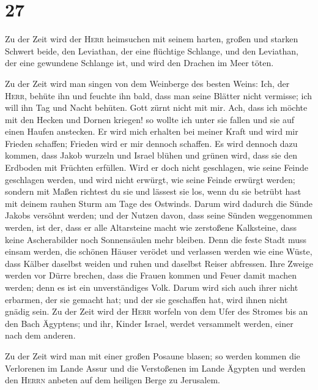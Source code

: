 \hypertarget{section-26}{%
\section{27}\label{section-26}}

 Zu der Zeit wird der \textsc{Herr} heimsuchen mit seinem
harten, großen und starken Schwert beide, den Leviathan, der eine
flüchtige Schlange, und den Leviathan, der eine gewundene Schlange ist,
und wird den Drachen im Meer töten.

 Zu der Zeit wird man singen von dem Weinberge des besten
Weins:  Ich, der \textsc{Herr}, behüte ihn und feuchte ihn
bald, dass man seine Blätter nicht vermisse; ich will ihn Tag und Nacht
behüten.  Gott zürnt nicht mit mir. Ach, dass ich möchte
mit den Hecken und Dornen kriegen! so wollte ich unter sie fallen und
sie auf einen Haufen anstecken.  Er wird mich erhalten bei
meiner Kraft und wird mir Frieden schaffen; Frieden wird er mir dennoch
schaffen.  Es wird dennoch dazu kommen, dass Jakob wurzeln
und Israel blühen und grünen wird, dass sie den Erdboden mit Früchten
erfüllen.  Wird er doch nicht geschlagen, wie seine Feinde
geschlagen werden, und wird nicht erwürgt, wie seine Feinde erwürgt
werden;  sondern mit Maßen richtest du sie und lässest sie
los, wenn du sie betrübt hast mit deinem rauhen Sturm am Tage des
Ostwinds.  Darum wird dadurch die Sünde Jakobs versöhnt
werden; und der Nutzen davon, dass seine Sünden weggenommen werden, ist
der, dass er alle Altarsteine macht wie zerstoßene Kalksteine, dass
keine Ascherabilder noch Sonnensäulen mehr bleiben.  Denn
die feste Stadt muss einsam werden, die schönen Häuser verödet und
verlassen werden wie eine Wüste, dass Kälber daselbst weiden und ruhen
und daselbst Reiser abfressen.  Ihre Zweige werden vor
Dürre brechen, dass die Frauen kommen und Feuer damit machen werden;
denn es ist ein unverständiges Volk. Darum wird sich auch ihrer nicht
erbarmen, der sie gemacht hat; und der sie geschaffen hat, wird ihnen
nicht gnädig sein.  Zu der Zeit wird der \textsc{Herr}
worfeln von dem Ufer des Stromes bis an den Bach Ägyptens; und ihr,
Kinder Israel, werdet versammelt werden, einer nach dem anderen.

 Zu der Zeit wird man mit einer großen Posaune blasen; so
werden kommen die Verlorenen im Lande Assur und die Verstoßenen im Lande
Ägypten und werden den \textsc{Herrn} anbeten auf dem heiligen Berge zu
Jerusalem.

